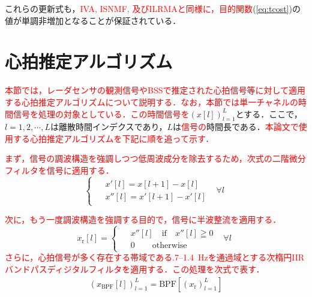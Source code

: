 これらの更新式も，\textcolor{red}{IVA, ISNMF, 及びILRMAと同様に，目的関数}(\ref{eq:tcost})の値が単調非増加となることが保証されている．


\section{心拍推定アルゴリズム}
\label{sec:conv:heartrateestalgo}

\textcolor{red}{本節では，レーダセンサの観測信号やBSSで推定された心拍信号等に対して適用する心拍推定アルゴリズムについて説明する．なお，本節では単一チャネルの時間信号を処理の対象としている．この時間信号を}$\left(x[l]\right)_{l=1}^{L}$とする．ここで，$l=1, 2, \cdots , L$は離散時間インデクスであり，$L$は\textcolor{red}{信号の}時間長である．\textcolor{red}{本論文で使用する心拍推定アルゴリズムを下記に順を追って示す．}

\textcolor{red}{まず，信号の調波構造を強調しつつ低周波成分を除去するため，次式の二階微分フィルタを信号に適用する．}
\begin{equation} 
    \begin{cases}
        \begin{split}
        & x'[l]=x[l+1]-x[l] \\
        & x''[l]=x'[l+1]-x'[l]
        \end{split}                         &   \forall{l}
    \end{cases}
\end{equation}

\textcolor{red}{次に，もう一度調波構造を強調する目的で，信号に半波整流を適用する．}
\begin{equation} 
x_{\mathrm{r}}[l] =
    \begin{cases}
        \begin{split}
        & x''[l]\quad \mathrm{if}\quad x''[l]\geqq0 \\
        & 0\hspace{25pt} \mathrm{otherwise}
        \end{split}                         &   \forall{l}
    \end{cases}
\end{equation}
\textcolor{red}{さらに，心拍信号が多く存在する帯域である.7--1.4~Hzを通過域とする次楕円IIRバンドパスディジタルフィルタを適用する．この処理を次式で表す．}
\begin{align}
    \left(x_{\mathrm{BPF}}[l]\right)_{l=1}^{L}=\mathrm{BPF}\left[\left(x_{\mathrm{r}}\right)_{l=1}^{L}\right]
\end{align} \label{eq:bpf}

